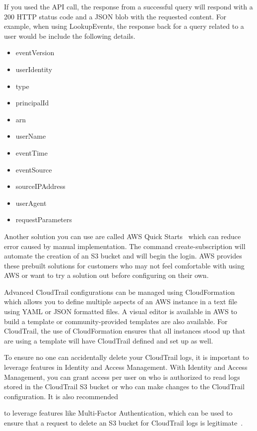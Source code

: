 If you used the API call, the response from a successful query will respond
with 
a 200 HTTP status code and a JSON blob with the requested content. For example,
when using LookupEvents, the response back for a query related to a user would
be 
include the following details.

\begin{itemize}
\item eventVersion
\item userIdentity
\item type
\item principalId
\item arn
\item userName
\item eventTime
\item eventSource
\item sourceIPAddress
\item userAgent
\item requestParameters
\end{itemize}

Another solution you can use are called AWS Quick 
Starts~\cite{hid-sp18-518-CloudTrail-Quick-Starts} which can reduce error 
caused by manual implementation. The command create-subscription will automate
the 
creation of an S3 bucket and will begin the login. AWS provides these prebuilt
solutions for customers who may not feel comfortable with using AWS or want
to try a solution out before configuring on their own.

Advanced CloudTrail configurations can be managed using 
CloudFormation~\cite{hid-sp18-518-CloudTrail-CloudFormation} which allows you
to define multiple aspects of an AWS instance in a text file using YAML or 
JSON formatted files. A visual editor is available in AWS to build a template
or community-provided templates are also available. For CloudTrail, the use
of CloudFormation ensures that all instances stood up that are using a template
will have CloudTrail defined and set up as well.

To ensure no one can  accidentally delete your CloudTrail logs,
it is important to leverage features in Identity and Access Management. With 
Identity and Access Management, you can grant access per user on who is 
authorized to read logs stored in the CloudTrail S3 bucket 
or who can make changes to the CloudTrail configuration. It is also recommended

to leverage features like Multi-Factor Authentication, which can be used to 
ensure that a request to delete an S3 bucket for CloudTrail logs is 
legitimate~\cite{hid-sp18-518-CloudTrail-user-guide}. 


